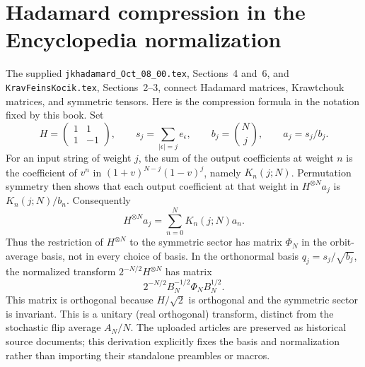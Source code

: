 \section{Hadamard compression in the Encyclopedia normalization}
\label{sec:uploaded-hadamard-compression}
The supplied \texttt{jkhadamard\_Oct\_08\_00.tex}, Sections~4 and~6,
and \texttt{KravFeinsKocik.tex}, Sections~2--3, connect Hadamard matrices,
Krawtchouk matrices, and symmetric tensors. Here is the compression
formula in the notation fixed by this book.
Set
\begin{equation*}
H=\begin{pmatrix}1&1\\1&-1\end{pmatrix},\qquad
s_j=\sum_{|\epsilon|=j}e_\epsilon,\qquad
b_j=\binom Nj,\qquad a_j=s_j/b_j.
\end{equation*}
For an input string of weight $j$, the sum of the output coefficients
at weight $n$ is the coefficient of $v^n$ in
$(1+v)^{N-j}(1-v)^j$, namely $K_n(j;N)$.
Permutation symmetry then shows that each output coefficient at that
weight in $H^{\otimes N}a_j$ is $K_n(j;N)/b_n$. Consequently
\begin{equation*}
H^{\otimes N}a_j=\sum_{n=0}^N K_n(j;N)a_n.
\end{equation*}
Thus the restriction of $H^{\otimes N}$ to the symmetric sector has matrix
$\Phi_N$ in the orbit-average basis, not in every choice of basis.
In the orthonormal basis $q_j=s_j/\sqrt{b_j}$, the normalized transform
$2^{-N/2}H^{\otimes N}$ has matrix
\begin{equation*}
2^{-N/2}B_N^{-1/2}\Phi_N B_N^{1/2}.
\end{equation*}
This matrix is orthogonal because $H/\sqrt2$ is orthogonal and the
symmetric sector is invariant. This is a unitary (real orthogonal)
transform, distinct from the stochastic flip average $A_N/N$.
The uploaded articles are preserved as historical source documents;
this derivation explicitly fixes the basis and normalization rather
than importing their standalone preambles or macros.
